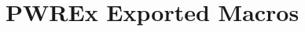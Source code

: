 \hypertarget{group___p_w_r_ex___exported___macros}{}\section{P\+W\+R\+Ex Exported Macros}
\label{group___p_w_r_ex___exported___macros}
